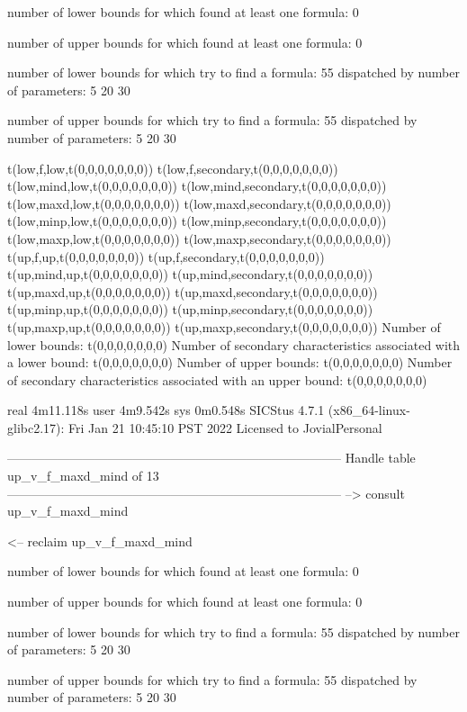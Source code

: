 number of lower bounds for which found at least one formula: 0

number of upper bounds for which found at least one formula: 0

number of lower bounds for which try to find a formula: 55
dispatched by number of parameters: 5  20  30

number of upper bounds for which try to find a formula: 55
dispatched by number of parameters: 5  20  30

t(low,f,low,t(0,0,0,0,0,0,0))
t(low,f,secondary,t(0,0,0,0,0,0,0))
t(low,mind,low,t(0,0,0,0,0,0,0))
t(low,mind,secondary,t(0,0,0,0,0,0,0))
t(low,maxd,low,t(0,0,0,0,0,0,0))
t(low,maxd,secondary,t(0,0,0,0,0,0,0))
t(low,minp,low,t(0,0,0,0,0,0,0))
t(low,minp,secondary,t(0,0,0,0,0,0,0))
t(low,maxp,low,t(0,0,0,0,0,0,0))
t(low,maxp,secondary,t(0,0,0,0,0,0,0))
t(up,f,up,t(0,0,0,0,0,0,0))
t(up,f,secondary,t(0,0,0,0,0,0,0))
t(up,mind,up,t(0,0,0,0,0,0,0))
t(up,mind,secondary,t(0,0,0,0,0,0,0))
t(up,maxd,up,t(0,0,0,0,0,0,0))
t(up,maxd,secondary,t(0,0,0,0,0,0,0))
t(up,minp,up,t(0,0,0,0,0,0,0))
t(up,minp,secondary,t(0,0,0,0,0,0,0))
t(up,maxp,up,t(0,0,0,0,0,0,0))
t(up,maxp,secondary,t(0,0,0,0,0,0,0))
Number of lower bounds:                                             t(0,0,0,0,0,0,0)
Number of secondary characteristics associated with a lower bound:  t(0,0,0,0,0,0,0)
Number of upper bounds:                                             t(0,0,0,0,0,0,0)
Number of secondary characteristics associated with an upper bound: t(0,0,0,0,0,0,0)

real	4m11.118s
user	4m9.542s
sys	0m0.548s
SICStus 4.7.1 (x86_64-linux-glibc2.17): Fri Jan 21 10:45:10 PST 2022
Licensed to JovialPersonal


--------------------------------------------------------------------------------
Handle table up_v_f_maxd_mind of 13
--------------------------------------------------------------------------------
--> consult up_v_f_maxd_mind

<-- reclaim up_v_f_maxd_mind

number of lower bounds for which found at least one formula: 0

number of upper bounds for which found at least one formula: 0

number of lower bounds for which try to find a formula: 55
dispatched by number of parameters: 5  20  30

number of upper bounds for which try to find a formula: 55
dispatched by number of parameters: 5  20  30

